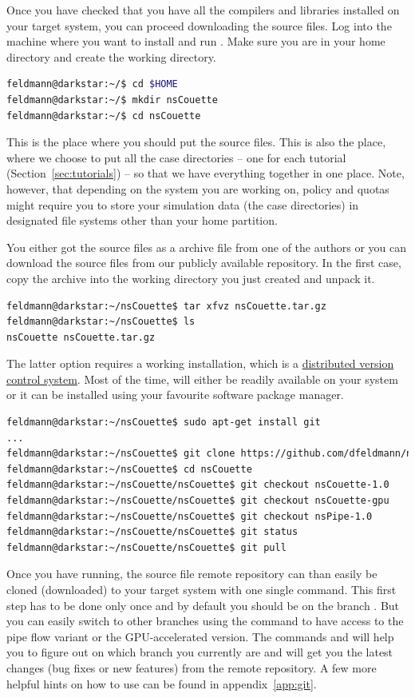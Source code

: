 \documentclass[a4paper, 11pt, DIV=11]{scrartcl}
\begin{document}
Once you have checked that you have all the compilers and libraries installed
on your target system, you can proceed downloading the \nsc source files. Log
into the machine where you want to install and run \nsc. Make sure you are in
your home directory and create the \nsc working directory.
\begin{lstlisting}[language=bash]
feldmann@darkstar:~/$ cd $HOME
feldmann@darkstar:~/$ mkdir nsCouette
feldmann@darkstar:~/$ cd nsCouette
\end{lstlisting}
This is the place where you should put the source files. This is also the place,
where we choose to put all the case directories -- one for each tutorial
(Section~\ref{sec:tutorials}) -- so that we have everything together in one place. Note,
however, that depending on the system you are working on, policy and quotas might
require you to store your simulation data (\ie the case directories) in
designated file systems other than your home partition.
\par
You either got the source files as a  archive file from one of the
authors or you can download the source files from our publicly available
\href{https://github.com/dfeldmann/nsCoutte}{} repository.
In the first case, copy the archive into the working directory you just created
and unpack it.
\begin{lstlisting}[language=bash]
feldmann@darkstar:~/nsCouette$ tar xfvz nsCouette.tar.gz
feldmann@darkstar:~/nsCouette$ ls
nsCouette nsCouette.tar.gz
\end{lstlisting}
The latter option requires a working  installation, which is a
\href{https://git-scm.com/}{distributed version control system}. Most of
the time,  will either be readily available on your system or
it can be installed using your favourite software package manager.
\begin{lstlisting}[language=bash]
feldmann@darkstar:~/nsCouette$ sudo apt-get install git
...
feldmann@darkstar:~/nsCouette$ git clone https://github.com/dfeldmann/nsCouette
feldmann@darkstar:~/nsCouette$ cd nsCouette
feldmann@darkstar:~/nsCouette/nsCouette$ git checkout nsCouette-1.0
feldmann@darkstar:~/nsCouette/nsCouette$ git checkout nsCouette-gpu
feldmann@darkstar:~/nsCouette/nsCouette$ git checkout nsPipe-1.0
feldmann@darkstar:~/nsCouette/nsCouette$ git status
feldmann@darkstar:~/nsCouette/nsCouette$ git pull
\end{lstlisting}
Once you have  running, the \nsc source file remote
repository can than easily be cloned (downloaded) to your target
system with one single command. This first step has to be done
only once and by default you should be on the branch .
But you can easily switch to other branches using the
 command to have access to the pipe flow variant
or the GPU-accelerated \cuda version. The
 commands  and  will help you
to figure out on which branch you currently are and will get you
the latest changes (\eg bug fixes or new features) from the remote
repository. A few more helpful hints on how to use  can
be found in appendix~\ref{app:git}.
\end{document}
